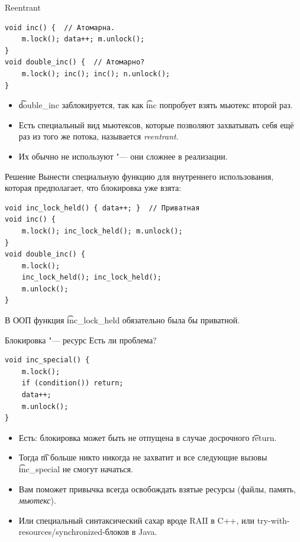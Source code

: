 \begin{frame}[fragile]{Reentrant}
\begin{verbatim}
void inc() {  // Атомарна.
    m.lock(); data++; m.unlock();
}
void double_inc() {  // Атомарно?
    m.lock(); inc(); inc(); n.unlock();
}
\end{verbatim}
	\begin{itemize}
		\item \t{double\_inc} заблокируется, так как \t{inc} попробует взять мьютекс второй раз.
		\item Есть специальный вид мьютексов, которые позволяют захватывать себя ещё раз из того же потока, называется \textit{reentrant}.
		\item Их обычно не используют "--- они сложнее в реализации.
	\end{itemize}
\end{frame}

\begin{frame}[fragile]{Решение}
	Вынести специальную функцию для внутреннего использования, которая предполагает, что блокировка уже взята:
\begin{verbatim}
void inc_lock_held() { data++; }  // Приватная
void inc() {
    m.lock(); inc_lock_held(); m.unlock();
}
void double_inc() {
    m.lock();
    inc_lock_held(); inc_lock_held();
    m.unlock();
}
\end{verbatim}
	В ООП функция \t{inc\_lock\_held} обязательно была бы приватной.
\end{frame}

\begin{frame}[fragile]{Блокировка "--- ресурс}
	Есть ли проблема?
\begin{verbatim}
void inc_special() {
    m.lock();
    if (condition()) return;
    data++;
    m.unlock();
}
\end{verbatim}
	\pause
	\begin{itemize}
		\item Есть: блокировка может быть не отпущена в случае досрочного \t{return}.
		\item Тогда \t{m} больше никто никогда не захватит и все следующие вызовы \t{inc\_special} не смогут начаться.
		\item Вам поможет привычка всегда освобождать взятые ресурсы (файлы, память, \textit{мьютекс}).
		\item Или специальный синтаксический сахар вроде RAII в C++, или try-with-resources/synchronized-блоков в Java.
	\end{itemize}
\end{frame}

